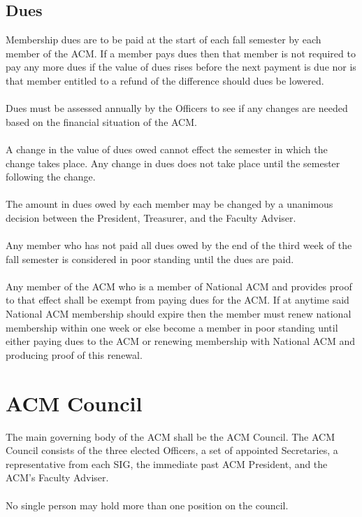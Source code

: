 \documentclass[12pt,titlepage]{article}
\begin{document}
\subsection{Dues}

Membership dues are to be paid at the start of each fall semester by each member of the ACM. If a member pays dues then that member is not required to pay any more dues if the value of dues rises before the next payment is due nor is that member entitled to a refund of the difference should dues be lowered.\\
\\
Dues must be assessed annually by the Officers to see if any changes are needed based on the financial situation of the ACM.\\
\\
A change in the value of dues owed cannot effect the semester in which the change takes place. Any change in dues does not take place until the semester following the change.\\
\\
The amount in dues owed by each member may be changed by a unanimous decision between the President, Treasurer, and the Faculty Adviser.\\
\\
Any member who has not paid all dues owed by the end of the third week of the fall semester is considered in poor standing until the dues are paid.\\
\\
Any member of the ACM who is a member of National ACM and provides proof to that effect shall be exempt from paying dues for the ACM. If at anytime said National ACM membership should expire then the member must renew national membership within one week or else become a member in poor standing until either paying dues to the ACM or renewing membership with National ACM and producing proof of this renewal.

\section{ACM Council}

The main governing body of the ACM shall be the ACM Council. The ACM Council consists of the three elected Officers, a set of appointed Secretaries, a representative from each SIG, the immediate past ACM President, and the ACM's Faculty Adviser.\\
\\
No single person may hold more than one position on the council.
\end{document}
